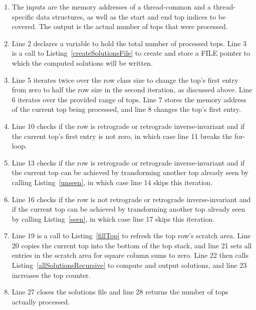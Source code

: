 \begin{enumerate}
\item The inputs are the memory addresses of a thread-common and a thread-specific data structures, as well as the start and end top indices to be covered. The output is the actual number of tops that were processed.
\item Line 2 declares a variable to hold the total number of processed tops. Line 3 is a call to Listing~\ref{createSolutionsFile} to create and store a FILE pointer to which the computed solutions will be written.
\addtocounter{enumi}{2}
\item Line 5 iterates twice over the row class size to change the top's first entry from zero to half the row size in the second iteration, as discussed above. Line 6 iterates over the provided range of tops. Line 7 stores the memory address of the current top being processed, and line 8 changes the top's first entry.
\addtocounter{enumi}{4}
\item Line 10 checks if the row is retrograde or retrograde inverse-invariant and if the current top's first entry is not zero, in which case line 11 breaks the for-loop.
\addtocounter{enumi}{2}
\item Line 13 checks if the row is retrograde or retrograde inverse-invariant and if the current top can be achieved by transforming another top already seen by calling Listing~\ref{unseen}, in which case line 14 skips this iteration.
\addtocounter{enumi}{2}
\item Line 16 checks if the row is not retrograde or retrograde inverse-invariant and if the current top can be achieved by transforming another top already seen by calling Listing~\ref{seen}, in which case line 17 skips this iteration.
\addtocounter{enumi}{2}
\item Line 19 is a call to Listing~\ref{fillTop} to refresh the top row's scratch area. Line 20 copies the current top into the bottom of the top stack, and line 21 sets all entries in the scratch area for square column sums to zero. Line 22 then calls Listing~\ref{allSolutionsRecursive} to compute and output solutions, and line 23 increases the top counter.
\addtocounter{enumi}{7}
\item Line 27 closes the solutions file and line 28 returns the number of tops actually processed.
\end{enumerate}

